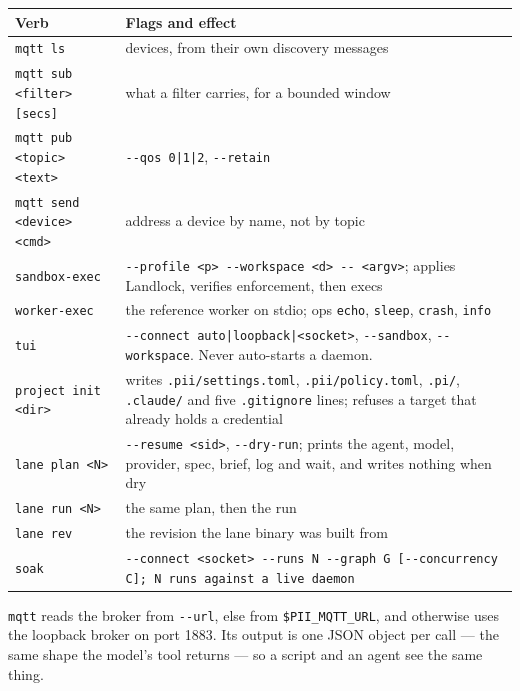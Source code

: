 \begin{center}
\begin{tabular}{@{}>{\raggedright\arraybackslash}p{}>{\raggedright\arraybackslash}p{}@{}}
  \toprule
  \textbf{Verb} & \textbf{Flags and effect} \\
  \midrule
  \texttt{mqtt ls} & devices, from their own discovery messages \\
  \texttt{mqtt sub <filter> [secs]} & what a filter carries, for a bounded window \\
  \texttt{mqtt pub <topic> <text>} & \texttt{-{}-qos 0|1|2}, \texttt{-{}-retain} \\
  \texttt{mqtt send <device> <cmd>} & address a device by name, not by topic \\
  \texttt{sandbox-exec} & \texttt{-{}-profile <p> -{}-workspace <d> -{}- <argv>}; applies
    Landlock, verifies enforcement, then execs \\
  \texttt{worker-exec} & the reference worker on stdio; ops \texttt{echo}, \texttt{sleep},
    \texttt{crash}, \texttt{info} \\
  \texttt{tui} & \texttt{-{}-connect auto|loopback|<socket>}, \texttt{-{}-sandbox},
    \texttt{-{}-workspace}. Never auto-starts a daemon. \\
  \texttt{project init <dir>} & writes \texttt{.pii/settings.toml}, \texttt{.pii/policy.toml},
    \texttt{.pi/}, \texttt{.claude/} and five \texttt{.gitignore} lines; refuses a target that
    already holds a credential \\
  \texttt{lane plan <N>} & \texttt{-{}-resume <sid>}, \texttt{-{}-dry-run}; prints the agent,
    model, provider, spec, brief, log and wait, and writes nothing when dry \\
  \texttt{lane run <N>} & the same plan, then the run \\
  \texttt{lane rev} & the revision the lane binary was built from \\
  \texttt{soak} & \texttt{-{}-connect <socket> -{}-runs N -{}-graph G
    [-{}-concurrency C]; N runs against a live daemon} \\
  \bottomrule
\end{tabular}
\end{center}

\texttt{mqtt} reads the broker from \texttt{-{}-url}, else from \texttt{\$PII\_MQTT\_URL}, and
otherwise uses the loopback broker on port 1883. Its output is one JSON object per call --- the same shape the
model's tool returns --- so a script and an agent see the same thing.

